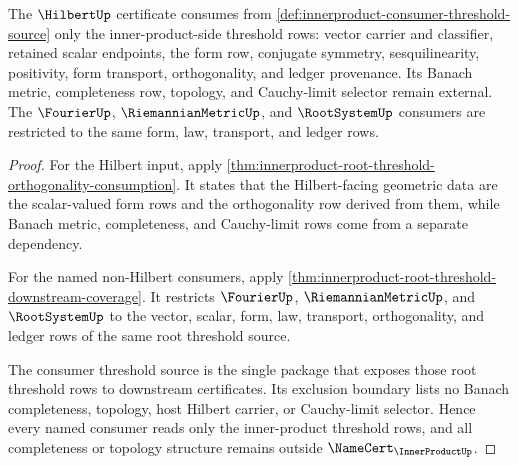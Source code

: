 \begin{theorem}
\label{thm:innerproduct-consumer-hilbert-threshold-package}
The $\HilbertUp$ certificate consumes from
\autoref{def:innerproduct-consumer-threshold-source} only the
inner-product-side threshold rows: vector carrier and classifier, retained
scalar endpoints, the form row, conjugate symmetry, sesquilinearity,
positivity, form transport, orthogonality, and ledger provenance. Its Banach
metric, completeness row, topology, and Cauchy-limit selector remain external.
The $\FourierUp$, $\RiemannianMetricUp$, and $\RootSystemUp$ consumers are
restricted to the same form, law, transport, and ledger rows.
\end{theorem}
\begin{proof}
For the Hilbert input, apply
\autoref{thm:innerproduct-root-threshold-orthogonality-consumption}. It
states that the Hilbert-facing geometric data are the scalar-valued form rows
and the orthogonality row derived from them, while Banach metric,
completeness, and Cauchy-limit rows come from a separate dependency.

For the named non-Hilbert consumers, apply
\autoref{thm:innerproduct-root-threshold-downstream-coverage}. It restricts
$\FourierUp$, $\RiemannianMetricUp$, and $\RootSystemUp$ to the vector,
scalar, form, law, transport, orthogonality, and ledger rows of the same root
threshold source.

The consumer threshold source is the single package that exposes those root
threshold rows to downstream certificates. Its exclusion boundary lists no
Banach completeness, topology, host Hilbert carrier, or Cauchy-limit selector.
Hence every named consumer reads only the inner-product threshold rows, and
all completeness or topology structure remains outside
$\NameCert_{\InnerProductUp}$.
\end{proof}
